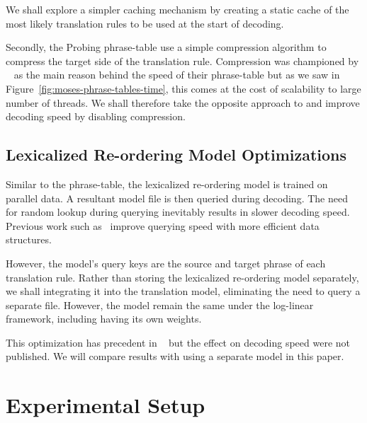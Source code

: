 \documentclass[]{article}
\begin{document}
We shall explore a simpler caching mechanism by creating a static cache of the most likely translation rules to be used at the start of decoding.

Secondly, the Probing phrase-table use a simple compression algorithm to compress the target side of the translation rule. Compression was championed by ~\cite{junczys_tsd_2012b} as the main reason behind the speed of their phrase-table but as we saw in Figure~\ref{fig:moses-phrase-tables-time}, this comes at the cost of scalability to large number of threads. We shall therefore take the opposite approach to and improve decoding speed by disabling compression.

\subsection{Lexicalized Re-ordering Model Optimizations}

Similar to the phrase-table, the lexicalized re-ordering model is trained on parallel data. A resultant model file is then queried during decoding. The need for random lookup during querying inevitably results in slower decoding speed. Previous work such as~\cite{junczys_tsd_2012b} improve querying speed with more efficient data structures.

However, the model's query keys are the source and target phrase of each translation rule. Rather than storing the lexicalized re-ordering model separately, we shall integrating it into the translation model, eliminating the need to query a separate file. However, the model remain the same under the log-linear framework, including having its own weights. %

This optimization has precedent in ~\cite{peitz2012jane} but the effect on decoding speed were not published. We will compare results with using a separate model in this paper.

\section{Experimental Setup}
\label{sec:Experimental Setup}
\end{document}
